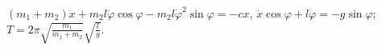 $(m_1 + m_2)\ddot{x} + m_2l\ddot{\varphi}\cos{\varphi} -
m_2l\dot{\varphi}^2\sin{\varphi} = -cx$,
$\ddot{x}\cos{\varphi} + l\ddot{\varphi} = -g\sin{\varphi}$;
$T = 2\pi\sqrt{\frac{m_1}{m_1 + m_2}}\sqrt{\frac{l}{g}}$.
